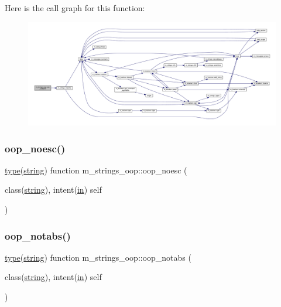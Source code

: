 Here is the call graph for this function\+:
\nopagebreak
\begin{figure}[H]
\begin{center}
\leavevmode
\includegraphics[width=350pt]{namespacem__strings__oop_ab88f5f814c08f1c93c95fcd0ba2a6779_cgraph}
\end{center}
\end{figure}
\mbox{\label{namespacem__strings__oop_ae1ed148f1ae0694ac093d3e11f9b702b}} 
\subsubsection{\texorpdfstring{oop\+\_\+noesc()}{oop\_noesc()}}
{\footnotesize\ttfamily \hyperlink{stop__watch_83_8txt_a70f0ead91c32e25323c03265aa302c1c}{type}(\hyperlink{structm__strings__oop_1_1string}{string}) function m\+\_\+strings\+\_\+oop\+::oop\+\_\+noesc (\begin{DoxyParamCaption}\item[{class(\hyperlink{structm__strings__oop_1_1string}{string}), intent(\hyperlink{M__journal_83_8txt_afce72651d1eed785a2132bee863b2f38}{in})}]{self }\end{DoxyParamCaption})\hspace{0.3cm}{\ttfamily [private]}}

\mbox{\label{namespacem__strings__oop_a5959b2f967a6466c198b39a089ef8a68}} 
\subsubsection{\texorpdfstring{oop\+\_\+notabs()}{oop\_notabs()}}
{\footnotesize\ttfamily \hyperlink{stop__watch_83_8txt_a70f0ead91c32e25323c03265aa302c1c}{type}(\hyperlink{structm__strings__oop_1_1string}{string}) function m\+\_\+strings\+\_\+oop\+::oop\+\_\+notabs (\begin{DoxyParamCaption}\item[{class(\hyperlink{structm__strings__oop_1_1string}{string}), intent(\hyperlink{M__journal_83_8txt_afce72651d1eed785a2132bee863b2f38}{in})}]{self }\end{DoxyParamCaption})\hspace{0.3cm}{\ttfamily [private]}}

